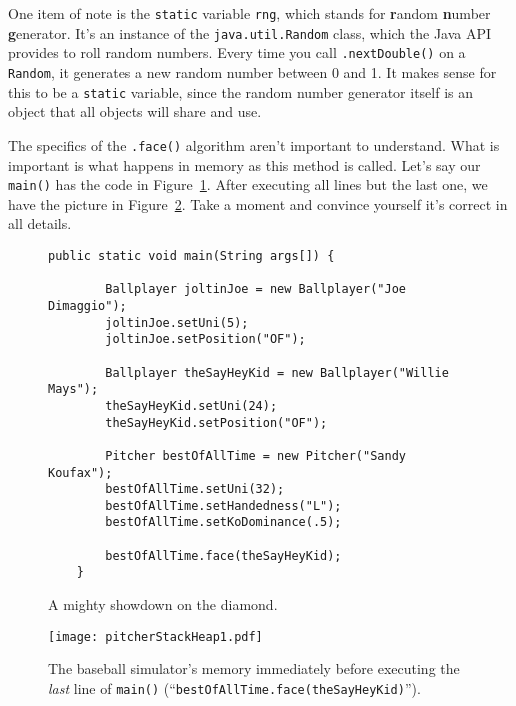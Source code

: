 \label{Random}
One item of note is the \texttt{static} variable \texttt{rng}, which stands
for \textbf{r}andom \textbf{n}umber \textbf{g}enerator. It's an instance of
the \texttt{java.util.Random} class, which the Java API provides to roll
random numbers. Every time you call \texttt{.nextDouble()} on a
\texttt{Random}, it generates a new random number between 0 and 1. It makes
sense for this to be a \texttt{static} variable, since the random number
generator itself is an object that all objects will share and use.

The specifics of the \texttt{.face()} algorithm aren't important to
understand. What is important is what happens in memory as this method is
called. Let's say our \texttt{main()} has the code in
Figure~\ref{fig:showdownCode}. After executing all lines but the last one, we
have the picture in Figure~\ref{fig:pitcherStackHeap1}. Take a moment and
convince yourself it's correct in all details.

\begin{figure}
\begin{Verbatim}[fontsize=\footnotesize,samepage=true,frame=single]
    public static void main(String args[]) {

        Ballplayer joltinJoe = new Ballplayer("Joe Dimaggio");
        joltinJoe.setUni(5);
        joltinJoe.setPosition("OF");

        Ballplayer theSayHeyKid = new Ballplayer("Willie Mays");
        theSayHeyKid.setUni(24);
        theSayHeyKid.setPosition("OF");

        Pitcher bestOfAllTime = new Pitcher("Sandy Koufax");
        bestOfAllTime.setUni(32);
        bestOfAllTime.setHandedness("L");
        bestOfAllTime.setKoDominance(.5);

        bestOfAllTime.face(theSayHeyKid);
    }
\end{Verbatim}
\caption{A mighty showdown on the diamond.}
\label{fig:showdownCode}
\end{figure}

\begin{figure}
\centering
\texttt{[image: pitcherStackHeap1.pdf]}  %
\caption{The baseball simulator's memory immediately before executing the
\textit{last} line of \texttt{main()} (``\texttt{bestOfAllTime.face(theSayHeyKid)}'').}
\label{fig:pitcherStackHeap1}
\end{figure}


